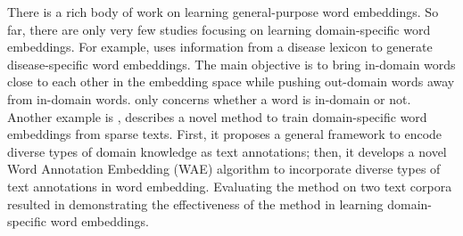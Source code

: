 There is a rich body of work on learning general-purpose word embeddings. So far, there are only very few studies focusing on learning domain-specific word embeddings. For example, \citeauthor{ghosh2016designing} \citeyear{ghosh2016designing} \cite{ghosh2016designing} uses information from a disease lexicon to generate disease-specific word embeddings. The main objective is to bring in-domain words close to each other in the embedding space while pushing out-domain words away from in-domain words. \citeauthor{ghosh2016designing} \citeyear{ghosh2016designing} \cite{ghosh2016designing} only concerns whether a word is in-domain or not.
Another example is \citeauthor{domainSpecificWordEmbedding} \citeyear{domainSpecificWordEmbedding} \cite{domainSpecificWordEmbedding}, describes a novel method to train domain-specific word embeddings from sparse texts. First, it proposes a general framework to encode diverse types of domain knowledge as text annotations; then, it develops a novel Word Annotation Embedding (WAE) algorithm to incorporate diverse types of text annotations in word embedding. Evaluating the method on two text corpora resulted in demonstrating the effectiveness of the method in learning domain-specific word embeddings.

